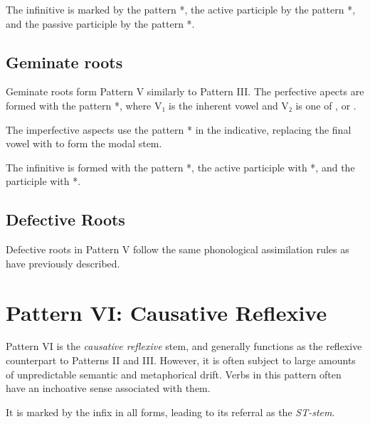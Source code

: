 \documentclass[grammar]{subfiles}
\begin{document}
The infinitive is marked by the pattern *, the active participle
by the pattern *, and the passive participle by the pattern
*.  


\subsection{Geminate roots}
\label{ssec:vm_v_geminate_roots}

Geminate roots form Pattern V similarly to Pattern III.   The perfective apects are formed with the pattern
*, where V₁ is the inherent vowel and V₂ is one of ,
 or .

The imperfective aspects use the pattern * in the indicative,
replacing the final vowel with  to form the modal stem. 

The infinitive is formed with the pattern *, the active participle
with *, and the participle with *.  


\subsection{Defective Roots}
\label{ssec:vm_v_defective_roots}

Defective roots in Pattern V follow the same phonological assimilation rules
as have previously described. 


\section{Pattern VI: Causative Reflexive}
\label{sec:vm_pattern_vi}

Pattern VI is the \emph{causative reflexive} stem, and generally functions as the
reflexive counterpart to Patterns II and III.  However, it is often subject to
large amounts of unpredictable semantic and metaphorical drift.  Verbs in this
pattern often have an inchoative sense associated with them. 

It is marked by the infix  in all forms, leading to its referral as the \emph{ST-stem}. 

\end{document}
